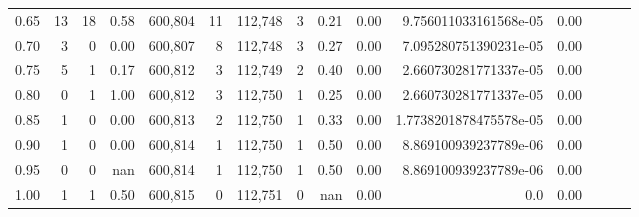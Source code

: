 \begin{tabular}{rrrrrrrrrrrrrrr}
0.65 &       13 &      18 &  0.58 &  600,804 &       11 &  112,748 &        3 &  0.21 &  0.00 &   9.756011033161568e-05 &      0.00 \\
0.70 &        3 &       0 &  0.00 &  600,807 &        8 &  112,748 &        3 &  0.27 &  0.00 &   7.095280751390231e-05 &      0.00 \\
0.75 &        5 &       1 &  0.17 &  600,812 &        3 &  112,749 &        2 &  0.40 &  0.00 &   2.660730281771337e-05 &      0.00 \\
0.80 &        0 &       1 &  1.00 &  600,812 &        3 &  112,750 &        1 &  0.25 &  0.00 &   2.660730281771337e-05 &      0.00 \\
0.85 &        1 &       0 &  0.00 &  600,813 &        2 &  112,750 &        1 &  0.33 &  0.00 &  1.7738201878475578e-05 &      0.00 \\
0.90 &        1 &       0 &  0.00 &  600,814 &        1 &  112,750 &        1 &  0.50 &  0.00 &   8.869100939237789e-06 &      0.00 \\
0.95 &        0 &       0 &   nan &  600,814 &        1 &  112,750 &        1 &  0.50 &  0.00 &   8.869100939237789e-06 &      0.00 \\
1.00 &        1 &       1 &  0.50 &  600,815 &        0 &  112,751 &        0 &   nan &  0.00 &                     0.0 &      0.00 \\
\bottomrule
\end{tabular}
